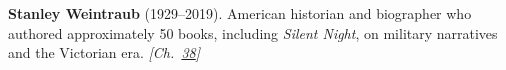 \textbf{Stanley Weintraub} (1929–2019). American historian and biographer who authored approximately 50 books, including \emph{Silent Night}, on military narratives and the Victorian era. \emph{[Ch.~\hyperref[ch:christmastruce1914]{38}]}

